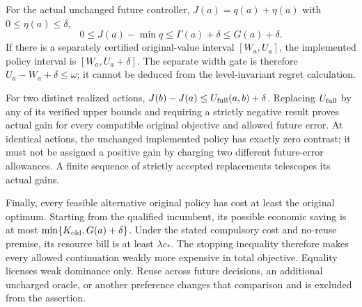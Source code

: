For the actual unchanged future controller,
$J(a)=q(a)+\eta(a)$ with $0\le\eta(a)\le\delta$,
\[
 0\le J(a)-\min q\le\Gamma(a)+\delta\le G(a)+\delta.
\]
If there is a separately certified original-value interval
$[W_a,U_a]$, the implemented policy interval is
$[W_a,U_a+\delta]$. The separate width gate is therefore
$U_a-W_a+\delta\le\omega$; it cannot be deduced from the
level-invariant regret calculation.

For two distinct realized actions,
$J(b)-J(a)\le U_{\rm full}(a,b)+\delta$.
Replacing $U_{\rm full}$ by any of its verified upper bounds
and requiring a strictly negative result proves actual gain for
every compatible original objective and allowed future error.
At identical actions, the unchanged implemented policy has exactly
zero contrast; it must not be assigned a positive gain by charging
two different future-error allowances. A finite sequence of
strictly accepted replacements telescopes its actual gains.

Finally, every feasible alternative original policy has cost at
least the original optimum. Starting from the qualified incumbent,
its possible economic saving is at most
$\min\{K_{\rm old},G(a)+\delta\}$. Under the stated compulsory
cost and no-reuse premise, its resource bill is at least
$\lambda c_*$. The stopping inequality therefore makes every
allowed continuation weakly more expensive in total objective.
Equality licenses weak dominance only. Reuse across future decisions,
an additional uncharged oracle, or another preference changes that
comparison and is excluded from the assertion.
